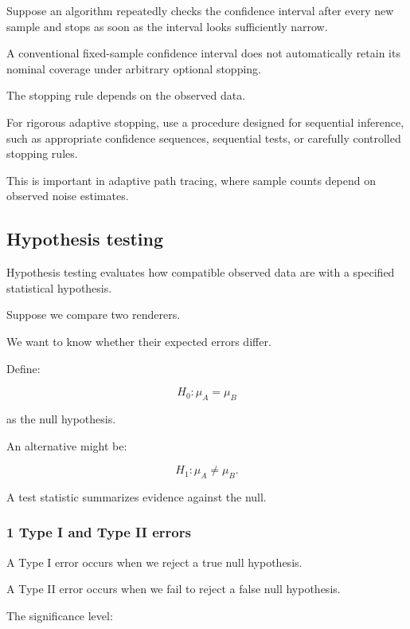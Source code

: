 Suppose an algorithm repeatedly checks the confidence interval after every new sample and stops as soon as the interval looks sufficiently narrow.

A conventional fixed-sample confidence interval does not automatically retain its nominal coverage under arbitrary optional stopping.

The stopping rule depends on the observed data.

For rigorous adaptive stopping, use a procedure designed for sequential inference, such as appropriate confidence sequences, sequential tests, or carefully controlled stopping rules.

This is important in adaptive path tracing, where sample counts depend on observed noise estimates.

\subsection{Hypothesis testing}\label{02-foundations-ii-ch030-hypothesis-testing}

\hypertarget{02-foundations-ii-ch030-hypothesis-testing}{}

Hypothesis testing evaluates how compatible observed data are with a specified statistical hypothesis.

Suppose we compare two renderers.

We want to know whether their expected errors differ.

Define:

\[
 H_0:\mu_A=\mu_B
\]

as the null hypothesis.

An alternative might be:

\[
 H_1:\mu_A\ne\mu_B.
\]

A test statistic summarizes evidence against the null.

\subsubsection{1 Type I and Type II errors}\label{02-foundations-ii-ch030-type-i-and-type-ii-errors}

\hypertarget{02-foundations-ii-ch030-type-i-and-type-ii-errors}{}

A Type I error occurs when we reject a true null hypothesis.

A Type II error occurs when we fail to reject a false null hypothesis.

The significance level:


